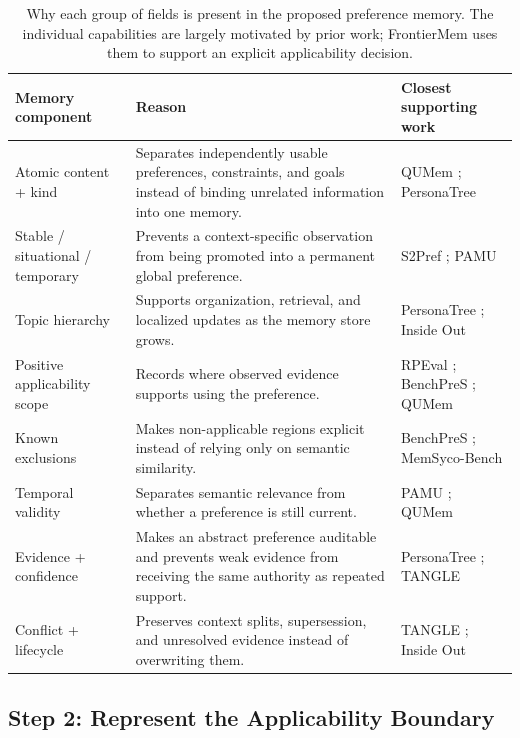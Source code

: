 \documentclass[11pt]{article}
\begin{document}
\begin{table}[t]
\centering
\small
\caption{Why each group of fields is present in the proposed preference memory. The individual capabilities are largely motivated by prior work; FrontierMem uses them to support an explicit applicability decision.}
\label{tab:schema}
\begin{tabularx}{\textwidth}{@{}p{}X p{}@{}}
\toprule
\textbf{Memory component} & \textbf{Reason} & \textbf{Closest supporting work} \\
\midrule
Atomic content + kind &
Separates independently usable preferences, constraints, and goals instead of binding unrelated information into one memory. &
QUMem \cite{wang2026qumem}; PersonaTree \cite{hou2026personatree} \\
Stable / situational / temporary &
Prevents a context-specific observation from being promoted into a permanent global preference. &
S2Pref \cite{gao2026s2pref}; PAMU \cite{sun2026pamu} \\
Topic hierarchy &
Supports organization, retrieval, and localized updates as the memory store grows. &
PersonaTree \cite{hou2026personatree}; Inside Out \cite{zhao2026insideout} \\
Positive applicability scope &
Records where observed evidence supports using the preference. &
RPEval \cite{feng2026rpeval}; BenchPreS \cite{yoon2026benchpres}; QUMem \cite{wang2026qumem} \\
Known exclusions &
Makes non-applicable regions explicit instead of relying only on semantic similarity. &
BenchPreS \cite{yoon2026benchpres}; MemSyco-Bench \cite{xiang2026memsyco} \\
Temporal validity &
Separates semantic relevance from whether a preference is still current. &
PAMU \cite{sun2026pamu}; QUMem \cite{wang2026qumem} \\
Evidence + confidence &
Makes an abstract preference auditable and prevents weak evidence from receiving the same authority as repeated support. &
PersonaTree \cite{hou2026personatree}; TANGLE \cite{yang2026tangle} \\
Conflict + lifecycle &
Preserves context splits, supersession, and unresolved evidence instead of overwriting them. &
TANGLE \cite{yang2026tangle}; Inside Out \cite{zhao2026insideout} \\
\bottomrule
\end{tabularx}
\end{table}

\subsection{Step 2: Represent the Applicability Boundary}
\end{document}
